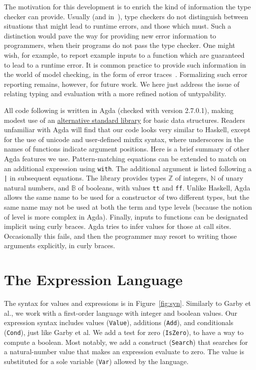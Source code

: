 \documentclass[acmsmall,screen,review]{acmart}
\begin{document}
The motivation for this development is to enrich the kind of
information the type checker can provide.  Usually (and
in~\citet{garby+25}), type checkers do not distinguish between
situations that might lead to runtime errors, and those which must.
Such a distinction would pave the way for providing new error
information to programmers, when their programs do not pass the type
checker.  One might wish, for example, to report example inputs to a
function which are guaranteed to lead to a runtime error.  It is
common practice to provide such information in the world of model
checking, in the form of error traces~\cite{jhala+09}.  Formalizing
such error reporting remains, however, for future work.  We here just
address the issue of relating typing and evaluation with a more
refined notion of untypability.

All code following is written in Agda (checked with version 2.7.0.1),
making modest use of an
\href{https://github.com/cedille/ial}{alternative standard library}
for basic data structures.  Readers unfamiliar with Agda will find
that our code looks very similar to Haskell, except for the use of
unicode and user-defined mixfix syntax, where underscores in the names
of functions indicate argument positions.  Here is a brief summary of
other Agda features we use. Pattern-matching equations can be extended
to match on an additional expression using \verb|with|.  The
additional argument is listed following a \verb;|; in subsequent
equations.  The library provides types $\mathbb{Z}$ of integers,
$\mathbb{N}$ of unary natural numbers, and $\mathbb{B}$ of booleans,
with values \verb|tt| and \verb|ff|.  Unlike Haskell, Agda allows the
same name to be used for a constructor of two different types, but the
same name may not be used at both the term and type levels (because
the notion of level is more complex in Agda).  Finally, inputs to
functions can be designated implicit using curly braces.  Agda tries
to infer values for those at call sites.  Occasionally this fails, and
then the programmer may resort to writing those arguments explicitly,
in curly braces.

\section{The Expression Language}

The syntax for values and expressions is in Figure~\ref{fig:syn}.  
Similarly to Garby et al., we work with a first-order language with
integer and boolean values.  Our expression syntax includes values (\verb|Value|),
additions (\verb|Add|), and conditionals (\verb|Cond|), just like
Garby et al.  We add a test for zero (\verb|IsZero|), to have a way to
compute a boolean.  Most notably, we add a construct (\verb|Search|)
that searches for a natural-number value that makes an expression
evaluate to zero.  The value is substituted for a sole variable
(\verb|Var|) allowed by the language.  
\end{document}
